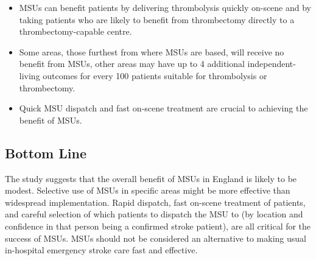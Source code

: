 \begin{itemize}
    \item MSUs can benefit patients by delivering thrombolysis quickly on-scene and by taking patients who are likely to benefit from thrombectomy directly to a thrombectomy-capable centre.
    \item Some areas, those furthest from where MSUs are based, will receive no benefit from MSUs, other areas may have up to 4 additional independent-living outcomes for every 100 patients suitable for thrombolysis or thrombectomy.
    \item Quick MSU dispatch and fast on-scene treatment are crucial to achieving the benefit of MSUs. 
\end{itemize}

\subsection*{Bottom Line}

The study suggests that the overall benefit of MSUs in England is likely to be modest. Selective use of MSUs in specific areas might be more effective than widespread implementation. Rapid dispatch, fast on-scene treatment of patients, and careful selection of which patients to dispatch the MSU to (by location and confidence in that person being a confirmed stroke patient), are all critical for the success of MSUs. MSUs should not be considered an alternative to making usual in-hospital emergency stroke care fast and effective.